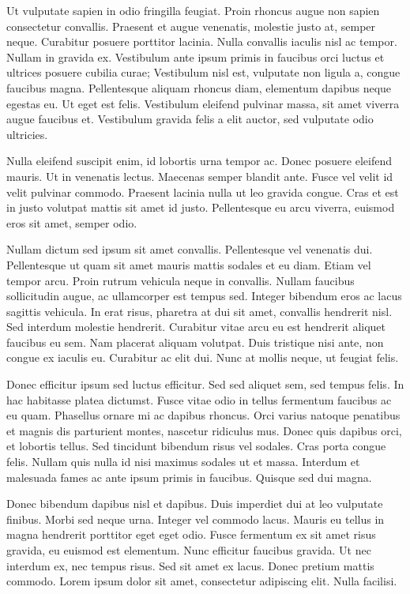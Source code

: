 \documentclass{article}
\begin{document}
Ut vulputate sapien in odio fringilla feugiat. Proin rhoncus augue non sapien consectetur convallis. Praesent et augue venenatis, molestie justo at, semper neque. Curabitur posuere porttitor lacinia. Nulla convallis iaculis nisl ac tempor. Nullam in gravida ex. Vestibulum ante ipsum primis in faucibus orci luctus et ultrices posuere cubilia curae; Vestibulum nisl est, vulputate non ligula a, congue faucibus magna. Pellentesque aliquam rhoncus diam, elementum dapibus neque egestas eu. Ut eget est felis. Vestibulum eleifend pulvinar massa, sit amet viverra augue faucibus et. Vestibulum gravida felis a elit auctor, sed vulputate odio ultricies.

Nulla eleifend suscipit enim, id lobortis urna tempor ac. Donec posuere eleifend mauris. Ut in venenatis lectus. Maecenas semper blandit ante. Fusce vel velit id velit pulvinar commodo. Praesent lacinia nulla ut leo gravida congue. Cras et est in justo volutpat mattis sit amet id justo. Pellentesque eu arcu viverra, euismod eros sit amet, semper odio.

Nullam dictum sed ipsum sit amet convallis. Pellentesque vel venenatis dui. Pellentesque ut quam sit amet mauris mattis sodales et eu diam. Etiam vel tempor arcu. Proin rutrum vehicula neque in convallis. Nullam faucibus sollicitudin augue, ac ullamcorper est tempus sed. Integer bibendum eros ac lacus sagittis vehicula. In erat risus, pharetra at dui sit amet, convallis hendrerit nisl. Sed interdum molestie hendrerit. Curabitur vitae arcu eu est hendrerit aliquet faucibus eu sem. Nam placerat aliquam volutpat. Duis tristique nisi ante, non congue ex iaculis eu. Curabitur ac elit dui. Nunc at mollis neque, ut feugiat felis.

Donec efficitur ipsum sed luctus efficitur. Sed sed aliquet sem, sed tempus felis. In hac habitasse platea dictumst. Fusce vitae odio in tellus fermentum faucibus ac eu quam. Phasellus ornare mi ac dapibus rhoncus. Orci varius natoque penatibus et magnis dis parturient montes, nascetur ridiculus mus. Donec quis dapibus orci, et lobortis tellus. Sed tincidunt bibendum risus vel sodales. Cras porta congue felis. Nullam quis nulla id nisi maximus sodales ut et massa. Interdum et malesuada fames ac ante ipsum primis in faucibus. Quisque sed dui magna.

Donec bibendum dapibus nisl et dapibus. Duis imperdiet dui at leo vulputate finibus. Morbi sed neque urna. Integer vel commodo lacus. Mauris eu tellus in magna hendrerit porttitor eget eget odio. Fusce fermentum ex sit amet risus gravida, eu euismod est elementum. Nunc efficitur faucibus gravida. Ut nec interdum ex, nec tempus risus. Sed sit amet ex lacus. Donec pretium mattis commodo. Lorem ipsum dolor sit amet, consectetur adipiscing elit. Nulla facilisi.
\end{document}
